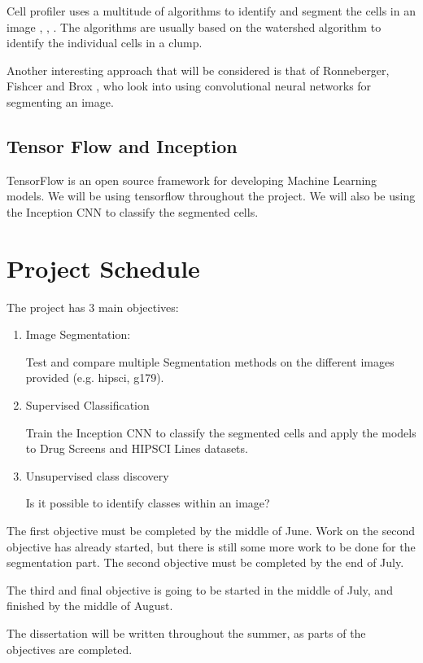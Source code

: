 \documentclass[12pt,a4paper]{article}
\begin{document}
Cell profiler uses a multitude of algorithms to identify and segment the cells in an image \cite{Malpica}, \cite{Meyer}, \cite{Ortiz}. The algorithms are usually based on the watershed algorithm to identify the individual cells in a clump.

Another interesting approach that will be considered is that of Ronneberger, Fishcer and Brox \cite{Ronneberger}, who look into using convolutional neural networks for segmenting an image.

\subsection{Tensor Flow and Inception}

TensorFlow\cite{tensorflow} is an open source framework for developing Machine Learning models. We will be using tensorflow throughout the project. We will also be using the Inception CNN\cite{inception} to classify the segmented cells.


\section{Project Schedule}
The project has 3 main objectives:
\begin{enumerate}
\item Image Segmentation:

Test and compare multiple Segmentation methods on the different images provided (e.g. hipsci, g179).

\item Supervised Classification

Train the Inception CNN to classify the segmented cells and apply the models to Drug Screens and HIPSCI Lines datasets.

\item Unsupervised class discovery

Is it possible to identify classes within an image?
\end{enumerate}

The first objective must be completed by the middle of June. Work on the second objective has already started, but there is still some more work to be done for the segmentation part. The second objective must be completed by the end of July.

The third and final objective is going to be started in the middle of July, and finished by the middle of August.

The dissertation will be written throughout the summer, as parts of the objectives are completed.
\end{document}
